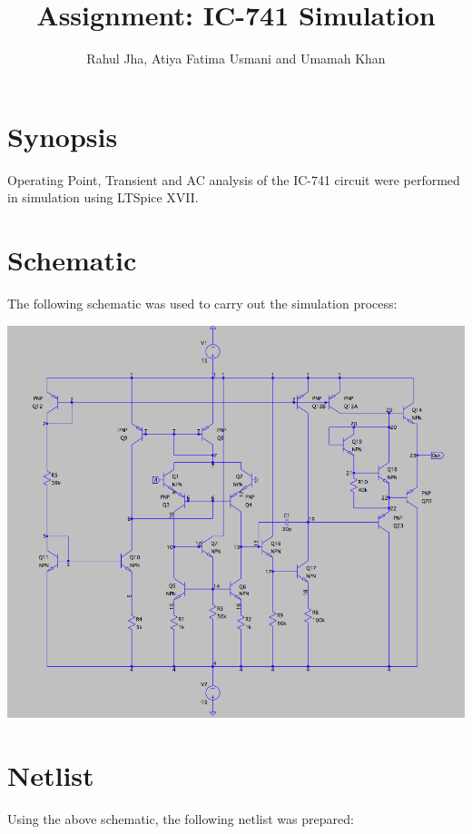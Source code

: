 \documentclass[11pt]{article}
\begin{document}
\author{Rahul Jha, Atiya Fatima Usmani and Umamah Khan}
\title{Assignment: IC-741 Simulation}
\maketitle

\section{Synopsis}
Operating Point, Transient and AC analysis of the IC-741 circuit were performed in simulation using LTSpice XVII.
\newpage

\section{Schematic}
The following schematic was used to carry out the simulation process:
\newline

\includegraphics[width=\textwidth]{Schematic.png}

\section{Netlist}
Using the above schematic, the following netlist was prepared:
\end{document}
